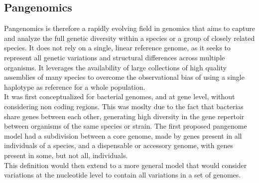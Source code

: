 
\subsection{Pangenomics}
Pangenomics is therefore a rapidly evolving field in genomics that aims to capture and analyze the full genetic diversity within a species or a group of closely related species. It does not rely on a single, linear reference genome, as it seeks to represent all genetic variations and structural differences across multiple organisms. It leverages the availability of large collections of high quality assemblies of many species to overcome the observational bias of using a single haplotype as reference for a whole population.\\
It was first conceptualized for bacterial genomes, and at gene level, without considering non coding regions. This was moslty due to the fact that bacterias share genes between each other, generating high diversity in the gene repertoir between organisms of the same species or strain.
The first proposed pangenome model had a subdivision between a core genome, made by genes present in all individuals of a species, and a dispensable or accessory genome, with genes present in some, but not all, individuals.\\
This definition would then extend to a more general model that would consider variations at the nucleotide level to contain all variations in a set of genomes.\\
